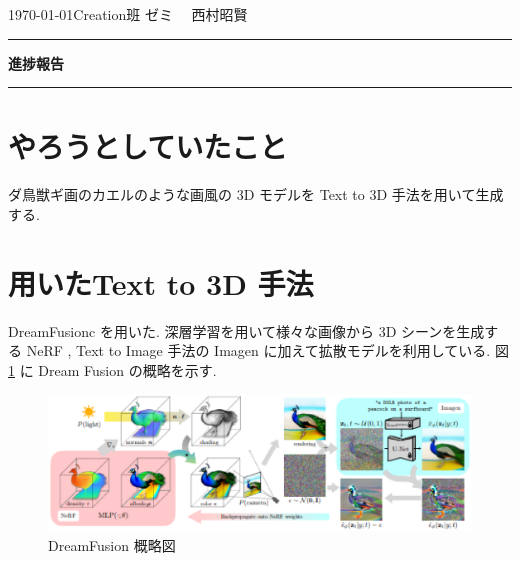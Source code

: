 \documentclass{jarticle}     %
\begin{document}
  \noindent
  \hspace{1em}

  \today Creation班 ゼミ
  \hfill
  \ \  西村昭賢 

  \vspace{2mm}
  \hrule
  \begin{center}
  {\Large \bf 進捗報告}
  \end{center}
  \hrule
  \vspace{3mm}


\section{やろうとしていたこと}
ダ鳥獣ギ画\cite{sozai}のカエルのような画風の 3D モデルを Text to 3D 手法を用いて生成する.

\section{用いたText to 3D 手法}
DreamFusionc\cite{poole2022dreamfusion} を用いた.
深層学習を用いて様々な画像から 3D シーンを生成する NeRF \cite{NeRF}, Text to Image 手法の Imagen\cite{Imagen} に加えて拡散モデルを利用している.
図 \ref{fig:DreamFusion} に Dream Fusion の概略を示す. 

\begin{figure}[ht]
  \centering
  \includegraphics[width=120mm]{assets/dreamfusion.eps}
  \vspace{-0.3cm}
  \caption{DreamFusion 概略図}
  \label{fig:DreamFusion}
\end{figure}
\end{document}

